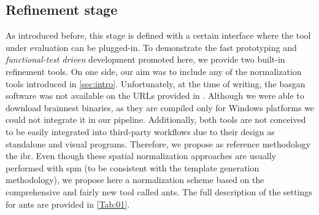 \documentclass{frontiers}
\begin{document}
\subsection{Refinement stage}\label{sec:meth_refinement}
As introduced before, this stage is defined with a certain interface where the
  tool under evaluation can be plugged-in.
To demonstrate the fast prototyping and \emph{functional-test driven} development
  promoted here, we provide two built-in refinement tools.
On one side, our aim was to include any of the normalization tools introduced in
  \autoref{sec:intro}.
Unfortunately, at the time of writing, the \gls*{basgan} software was not available
  on the URLs provided in \citep{calvini_basal_2007,skanjeti_assessing_2013}.
Although we were able to download \gls*{brainnest} binaries, as they are compiled 
  only for Windows platforms we could not integrate it in our pipeline.
Additionally, both tools are not conceived to be easily integrated into third-party
  workflows due to their design as standalone and visual programs.
Therefore, we propose as reference methodology the \acrfull*{ibr}.
Even though these spatial normalization approaches are usually performed with \gls*{spm}
  (to be consistent with the template generation methodology), we propose here 
  a normalization scheme based on the comprehensive and fairly new tool called \gls*{ants}.
The full description of the settings for \gls*{ants} are provided in \autoref{Tab:01}.
\end{document}
